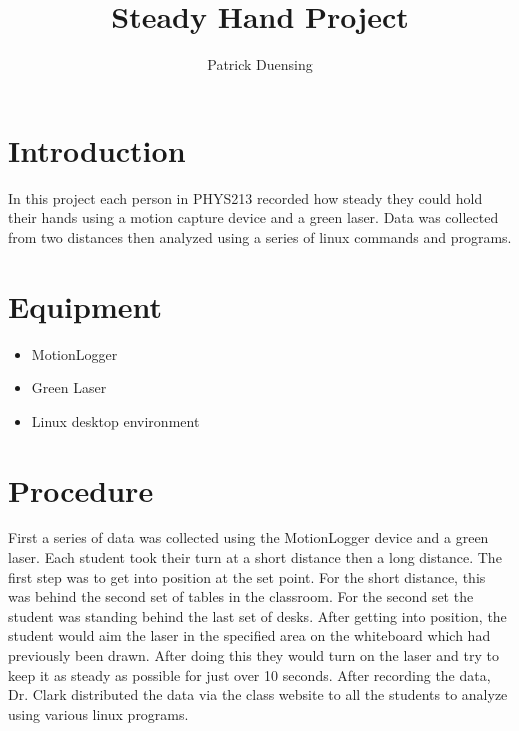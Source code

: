 \documentclass[10pt,letterpaper]{article}
\author{Patrick Duensing}
\title{Steady Hand Project}
\begin{document}
\section{Introduction}
	In this project each person in PHYS213 recorded how steady they could hold their hands using a motion capture device and a green laser. Data was collected from two distances then analyzed using a series of linux commands and programs.
\section{Equipment}
\begin{itemize}
\item MotionLogger
\item Green Laser
\item Linux desktop environment
\end{itemize}
\section{Procedure}
	First a series of data was collected using the MotionLogger device and a green laser. Each student took their turn at a short distance then a long distance. The first step was to get into position at the set point. For the short distance, this was behind the second set of tables in the classroom. For the second set the student was standing behind the last set of desks. After getting into position, the student would aim the laser in the specified area on the whiteboard which had previously been drawn. After doing this they would turn on the laser and try to keep it as steady as possible for just over 10 seconds. After recording the data, Dr. Clark distributed the data via the class website to all the students to analyze using various linux programs.
\end{document}
